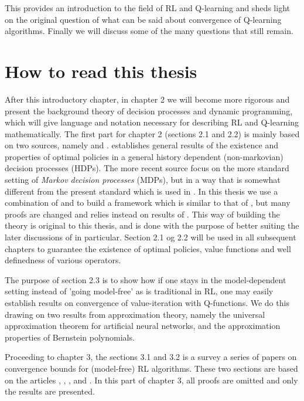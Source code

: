 This provides an introduction to the field of RL and Q-learning and sheds light 
on the original question of what can be said about convergence of
Q-learning algorithms. Finally we will discuss some of the many questions that
still remain.

\section{How to read this thesis}

After this introductory chapter,
in chapter 2 we will become more rigorous and
present the background theory of decision processes and dynamic programming,
which will give language and notation necessary for describing
RL and Q-learning mathematically.
The first part for chapter 2 (sections 2.1 and 2.2) is mainly based on two
sources, namely  and .
 establishes general results of the existence and properties of
optimal policies in a general history dependent (non-markovian)
decision processes (HDPs).
The more recent source  focus on the more standard setting
of \emph{Markov decision processes} (MDPs),
but in a way that is somewhat different from the present standard which
is used in .
In this thesis we use a combination of  and  to
build a framework which is similar to that of ,
but many proofs are changed and relies instead on results of .
This way of building the theory is original to this thesis, and
is done with the purpose of better suiting the later discussions
of  in particular.
Section 2.1 og 2.2 will be used in all subsequent chapters
to guarantee the existence of optimal policies, value functions
and well definedness of various operators.

The purpose of section 2.3 is to show how if one stays in the model-dependent
setting instead of 'going model-free' as is traditional in RL, 
one may easily establish results on convergence of value-iteration with
Q-functions. We do this drawing on two results from approximation theory,
namely the universal approximation theorem for artificial neural networks,
and the approximation properties of Bernstein polynomials.

Proceeding to chapter 3, the sections 3.1 and 3.2 is a survey a series of
papers on convergence bounds for (model-free) RL algorithms.
These two sections are based
on the articles , , , 
and .
In this part of chapter 3, all proofs are omitted and only the results
are presented.

